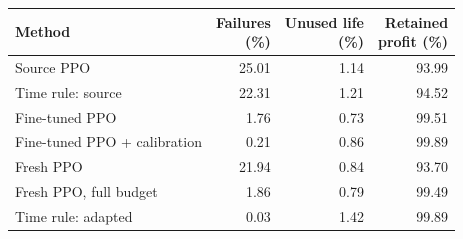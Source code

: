 {\footnotesize\setlength{\tabcolsep}{3pt}\renewcommand{\arraystretch}{1.08}%
\begin{tabular}{@{}lrrr@{}}
\toprule
Method & \shortstack{Failures\\(\%)} & \shortstack{Unused life\\(\%)} & \shortstack{Retained\\profit (\%)}\\
\midrule
Source PPO & 25.01 & 1.14 & 93.99\\
Time rule: source & 22.31 & 1.21 & 94.52\\
\midrule
Fine-tuned PPO & 1.76 & 0.73 & 99.51\\
Fine-tuned PPO + calibration & 0.21 & 0.86 & 99.89\\
Fresh PPO & 21.94 & 0.84 & 93.70\\
Fresh PPO, full budget & 1.86 & 0.79 & 99.49\\
Time rule: adapted & 0.03 & 1.42 & 99.89\\
\bottomrule
\end{tabular}}
